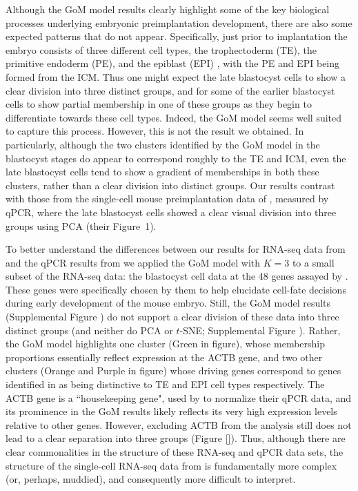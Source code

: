 \documentclass[10pt,letterpaper]{article}
\begin{document}
Although the GoM model results clearly highlight some of the key biological processes underlying embryonic preimplantation development, there are
also some expected patterns that do not appear. Specifically, just prior to implantation the embryo consists of three different cell types,
the trophectoderm (TE), the primitive endoderm (PE), and the
epiblast (EPI) \cite{rossant.tam.2009}, with the PE and EPI being formed from the ICM.
Thus one might expect the late blastocyst cells to show a clear division into three distinct groups, and
for some of the earlier blastocyst cells to show partial membership in one of these groups as they begin to differentiate towards these cell types.
Indeed, the GoM model seems well suited to capture this process. However, this is not the result we obtained.
In particularly, although the two clusters identified by the GoM model in the blastocyst stages
do appear to correspond roughly to the TE and ICM, even the late blastocyst cells tend to show a gradient of memberships in both these clusters, rather than a clear division into distinct groups. Our results contrast with those from the single-cell mouse preimplantation data of \cite{Guo2010}, measured by qPCR, where the late blastocyst cells showed a clear visual division into three groups using PCA (their Figure~1).

To better understand the differences between our results for RNA-seq data from \cite{deng.etal} and the qPCR results from \cite{Guo2010} we applied the GoM model
with $K=3$ to a small subset of the RNA-seq data: the blastocyst cell data at the 48 genes assayed by \cite{Guo2010}. These genes were specifically
chosen by them to help elucidate cell-fate decisions during early development of the mouse embryo. Still, the GoM model results (Supplemental Figure )
do not support a clear division of these data into three distinct
groups (and neither do PCA or $t$-SNE; Supplemental Figure ).
Rather, the GoM model highlights one cluster (Green in figure), whose membership proportions essentially reflect expression at the ACTB gene,
and two other clusters (Orange and Purple in figure) whose driving genes correspond to genes identified in \cite{Guo2010} as being distinctive to TE and EPI cell types respectively. The ACTB gene is a ``housekeeping gene", used by \cite{Guo2010} to normalize their qPCR data, and its prominence in the GoM results likely reflects its very high expression levels relative to other genes. However, excluding ACTB from the analysis still does not lead to a clear separation into three groups (Figure \ref{}).
Thus, although there are clear commonalities in the structure of these RNA-seq and qPCR data sets, the structure of the single-cell RNA-seq data  from \cite{deng.etal}  is fundamentally more complex (or, perhaps, muddied), and consequently more difficult to interpret.
\end{document}
